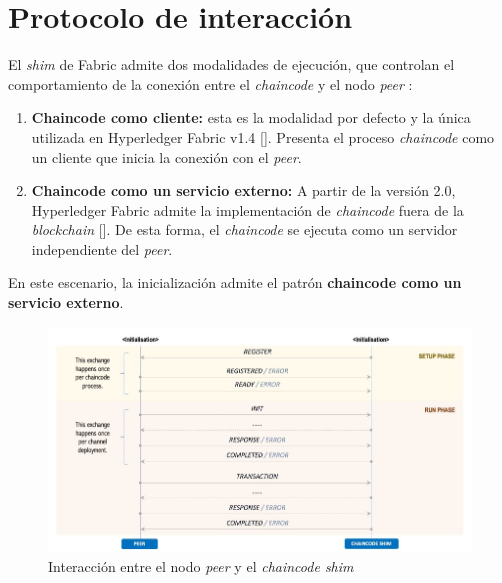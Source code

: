 \section{Protocolo de interacción}\label{protocolinteraction}
El \textit{shim} de Fabric admite dos modalidades de ejecución, que controlan el comportamiento de la conexión entre el \textit{chaincode} y el nodo \textit{peer} :

\begin{enumerate}
\item \textbf{Chaincode como cliente:} esta es la modalidad por defecto y la única utilizada en Hyperledger Fabric v1.4 [\cite{hlf-internals}]. Presenta el proceso \textit{chaincode} como un cliente que inicia la conexión con el \textit{peer}.

\item \textbf{Chaincode como un servicio externo:} A partir de la versión 2.0, Hyperledger Fabric admite la implementación de \textit{chaincode} fuera de la \textit{blockchain} [\cite{hlf-internals}]. De esta forma, el \textit{chaincode} se ejecuta como un servidor independiente del \textit{peer}.
\end{enumerate}

En este escenario, la inicialización admite el patrón \textbf{chaincode como  un servicio externo}.




\begin{figure}[tbph]
\centering
\includegraphics[width=\textwidth]{Images/interaction_protocol}
\caption{Interacción entre el nodo \textit{peer} y el \textit{chaincode shim}}
\label{fig:interactionprotocol}
\end{figure}

